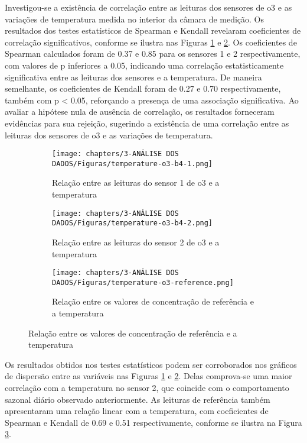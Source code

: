 Investigou-se a existência de correlação entre as leituras dos sensores de \acrshort{o3} e as variações de temperatura medida no interior da câmara de medição. Os resultados dos testes estatísticos de Spearman e Kendall revelaram coeficientes de correlação significativos, conforme se ilustra nas Figuras \ref{fig:data-temp-o3-1-corr} e \ref{fig:data-temp-o3-2-corr}. Os coeficientes de Spearman calculados foram de 0.37 e 0.85 para os sensores 1 e 2 respectivamente, com valores de p inferiores a 0.05, indicando uma correlação estatisticamente significativa entre as leituras dos sensores e a temperatura. De maneira semelhante, os coeficientes de Kendall foram de 0.27 e 0.70 respectivamente, também com p < 0.05, reforçando a presença de uma associação significativa. Ao avaliar a hipótese nula de ausência de correlação, os resultados forneceram evidências para sua rejeição, sugerindo a existência de uma correlação entre as leituras dos sensores de \acrshort{o3} e as variações de temperatura.

\begin{figure}[h!]
    \centering
    \caption{Relação entre as leituras dos sensores de \acrshort{o3} e a temperatura}
    \begin{subfigure}{0.495\textwidth}
        \texttt{[image: chapters/3-ANÁLISE DOS DADOS/Figuras/temperature-o3-b4-1.png]}
        \caption{Relação entre as leituras do sensor 1 de \acrshort{o3} e a temperatura}
        \label{fig:data-temp-o3-1-corr}    
    \end{subfigure}
    \hfill
    \begin{subfigure}{0.495\textwidth}
        \texttt{[image: chapters/3-ANÁLISE DOS DADOS/Figuras/temperature-o3-b4-2.png]}
        \caption{Relação entre as leituras do sensor 2 de \acrshort{o3} e a temperatura}
        \label{fig:data-temp-o3-2-corr}    
    \end{subfigure}
    \hfill
    \begin{subfigure}{0.495\textwidth}
        \texttt{[image: chapters/3-ANÁLISE DOS DADOS/Figuras/temperature-o3-reference.png]}
        \caption{Relação entre os valores de concentração de referência e a temperatura}
        \label{fig:data-temp-o3-ref-corr}    
    \end{subfigure}
    \label{fig:data-temp-o3-corr}
\end{figure}

Os resultados obtidos nos testes estatísticos podem ser corroborados nos gráficos de dispersão entre as variáveis nas Figuras \ref{fig:data-temp-o3-1-corr} e \ref{fig:data-temp-o3-2-corr}. Delas comprova-se uma maior correlação com a temperatura no sensor 2, que coincide com o comportamento sazonal diário observado anteriormente. As leituras de referência também apresentaram uma relação linear com a temperatura, com coeficientes de Spearman e Kendall de 0.69 e 0.51 respectivamente, conforme se ilustra na Figura \ref{fig:data-temp-o3-ref-corr}.

